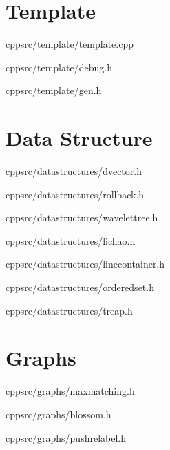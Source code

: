 \documentclass[portrait, 8pt, a4paper, oneside, twocolumn]{extarticle}
\begin{document}
\maketitlepage


\noindent\hrulefill


    \section{Template}

    {}
    {}
    {cpp}{src/template/template.cpp}
    \noindent\hrulefill

    {}
    {}
    {cpp}{src/template/debug.h}
    \noindent\hrulefill

    {}
    {}
    {cpp}{src/template/gen.h}
    \noindent\hrulefill

\section{Data Structure}
    {}
    {}
    {cpp}{src/datastructures/dvector.h}
    \noindent\hrulefill

    {}
    {}
    {cpp}{src/datastructures/rollback.h}
    \noindent\hrulefill

    {}
    {}
    {cpp}{src/datastructures/wavelettree.h}
    \noindent\hrulefill

    {}
    {}
    {cpp}{src/datastructures/lichao.h}
    \noindent\hrulefill

    {}
    {}
    {cpp}{src/datastructures/linecontainer.h}
    \noindent\hrulefill

    {}
    {}
    {cpp}{src/datastructures/orderedset.h}
    \noindent\hrulefill

    {}
    {}
    {cpp}{src/datastructures/treap.h}
    \noindent\hrulefill

\section{Graphs}
    {}
    {}
    {cpp}{src/graphs/maxmatching.h}
    \noindent\hrulefill

    {}
    {}
    {cpp}{src/graphs/blossom.h}
    \noindent\hrulefill

    {}
    {}
    {cpp}{src/graphs/pushrelabel.h}
    \noindent\hrulefill
\end{document}
